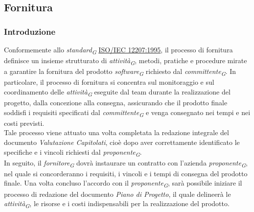 \subsection{Fornitura}
\subsubsection{Introduzione}
Conformemente allo \textit{standard}\textsubscript{\textit{G}} \href{https://www.math.unipd.it/~tullio/IS-1/2009/Approfondimenti/ISO_12207-1995.pdf}{ISO/IEC 12207:1995}, il processo di fornitura definisce un insieme strutturato di \textit{attività}\textsubscript{\textit{G}}, metodi, pratiche e procedure mirate a garantire la fornitura del prodotto \textit{software}\textsubscript{\textit{G}} richiesto dal \textit{committente}\textsubscript{\textit{G}}. 
In particolare, il processo di fornitura si concentra sul monitoraggio e sul coordinamento delle \textit{attività}\textsubscript{\textit{G}} eseguite dal team durante la realizzazione del progetto, dalla concezione alla consegna, assicurando che il prodotto finale soddisfi i requisiti specificati dal \textit{committente}\textsubscript{\textit{G}} e venga consegnato nei tempi e nei costi previsti. \\
Tale processo viene attuato una volta completata la redazione integrale del documento \textit{Valutazione Capitolati}, cioè dopo aver correttamente identificato le specifiche e i vincoli richiesti dal \textit{proponente}\textsubscript{\textit{G}}. \\
In seguito, il \textit{fornitore}\textsubscript{\textit{G}} dovrà instaurare un contratto con l'azienda \textit{proponente}\textsubscript{\textit{G}}, nel quale si concorderanno i requisiti, i vincoli e i tempi di consegna del prodotto finale. Una volta concluso l'accordo con il \textit{proponente}\textsubscript{\textit{G}}, sarà possibile iniziare il processo di redazione del documento
\textit{Piano di Progetto}, il quale delineerà le \textit{attività}\textsubscript{\textit{G}}, le risorse e i costi indispensabili per la realizzazione del prodotto.


